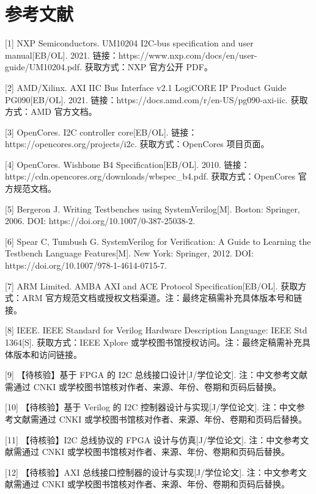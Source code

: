 \section{参考文献}\label{ux53c2ux8003ux6587ux732e}

{[}1{]} NXP Semiconductors. UM10204 I2C-bus specification and user
manual{[}EB/OL{]}. 2021.
链接：https://www.nxp.com/docs/en/user-guide/UM10204.pdf. 获取方式：NXP
官方公开 PDF。

{[}2{]} AMD/Xilinx. AXI IIC Bus Interface v2.1 LogiCORE IP Product Guide
PG090{[}EB/OL{]}. 2021.
链接：https://docs.amd.com/r/en-US/pg090-axi-iic. 获取方式：AMD
官方文档。

{[}3{]} OpenCores. I2C controller core{[}EB/OL{]}.
链接：https://opencores.org/projects/i2c. 获取方式：OpenCores 项目页面。

{[}4{]} OpenCores. Wishbone B4 Specification{[}EB/OL{]}. 2010.
链接：https://cdn.opencores.org/downloads/wbspec\_b4.pdf.
获取方式：OpenCores 官方规范文档。

{[}5{]} Bergeron J. Writing Testbenches using SystemVerilog{[}M{]}.
Boston: Springer, 2006. DOI: https://doi.org/10.1007/0-387-25038-2.

{[}6{]} Spear C, Tumbush G. SystemVerilog for Verification: A Guide to
Learning the Testbench Language Features{[}M{]}. New York: Springer,
2012. DOI: https://doi.org/10.1007/978-1-4614-0715-7.

{[}7{]} ARM Limited. AMBA AXI and ACE Protocol Specification{[}EB/OL{]}.
获取方式：ARM
官方规范文档或授权文档渠道。注：最终定稿需补充具体版本号和链接。

{[}8{]} IEEE. IEEE Standard for Verilog Hardware Description Language:
IEEE Std 1364{[}S{]}. 获取方式：IEEE Xplore
或学校图书馆授权访问。注：最终定稿需补充具体版本和访问链接。

{[}9{]} 【待核验】基于 FPGA 的 I2C 总线接口设计{[}J/学位论文{]}.
注：中文参考文献需通过 CNKI
或学校图书馆核对作者、来源、年份、卷期和页码后替换。

{[}10{]} 【待核验】基于 Verilog 的 I2C 控制器设计与实现{[}J/学位论文{]}.
注：中文参考文献需通过 CNKI
或学校图书馆核对作者、来源、年份、卷期和页码后替换。

{[}11{]} 【待核验】I2C 总线协议的 FPGA 设计与仿真{[}J/学位论文{]}.
注：中文参考文献需通过 CNKI
或学校图书馆核对作者、来源、年份、卷期和页码后替换。

{[}12{]} 【待核验】AXI 总线接口控制器的设计与实现{[}J/学位论文{]}.
注：中文参考文献需通过 CNKI
或学校图书馆核对作者、来源、年份、卷期和页码后替换。

